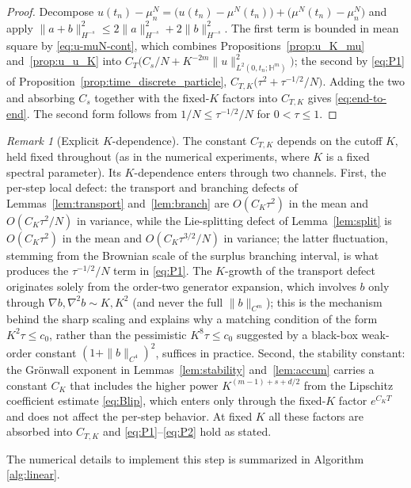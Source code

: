 \documentclass[a4paper,fleqn]{cas-sc}
\theoremstyle{definition}
\theoremstyle{remark}
\newtheorem{remark}[theorem]{Remark}
\begin{document}
\begin{proof}
Decompose $u(t_n)-\mu^N_n=\bigl(u(t_n)-\mu^N(t_n)\bigr)+\bigl(\mu^N(t_n)-\mu^N_n\bigr)$
and apply $\|a+b\|_{H^{-s}}^2\le2\|a\|_{H^{-s}}^2+2\|b\|_{H^{-s}}^2$. The first term is
bounded in mean square by \eqref{eq:u-muN-cont}, which combines
Propositions~\ref{prop:u_K_mu} and~\ref{prop:u_u_K} into
$C_T\bigl(C_s/N+K^{-2m}\|u\|_{L^2(0,t_n;\mathbb H^m)}^2\bigr)$; the second by
\eqref{eq:P1} of Proposition~\ref{prop:time_discrete_particle},
$C_{T,K}\bigl(\tau^2+\tau^{-1/2}/N\bigr)$. Adding the two and absorbing $C_s$ together
with the fixed-$K$ factors into $C_{T,K}$ gives \eqref{eq:end-to-end}. The second form
follows from $1/N\le\tau^{-1/2}/N$ for $0<\tau\le1$.
\end{proof}

\begin{remark}[Explicit $K$-dependence]\label{rem:K-scaling}
The constant $C_{T,K}$ depends on the cutoff $K$, held fixed throughout (as in the
numerical experiments, where $K$ is a fixed spectral parameter). Its
$K$-dependence enters through two channels. First, the per-step local defect: the
transport and branching defects of Lemmas~\ref{lem:transport}
and~\ref{lem:branch} are $O(C_K\tau^2)$ in the mean and $O(C_K\tau^2/N)$ in
variance, while the Lie-splitting defect of Lemma~\ref{lem:split} is
$O(C_K\tau^2)$ in the mean and $O(C_K\tau^{3/2}/N)$ in variance; the latter
fluctuation, stemming from the Brownian scale of the surplus branching interval,
is what produces the $\tau^{-1/2}/N$ term in \eqref{eq:P1}. The $K$-growth of the transport defect originates solely from the
order-two generator expansion, which involves $b$ only through $\nabla b,\nabla^2b
\sim K,K^2$ (and never the full $\|b\|_{C^m}$); this is the mechanism behind the
sharp scaling and explains why a matching condition of the form $K^2\tau\le c_0$,
rather than the pessimistic $K^8\tau\le c_0$ suggested by a black-box weak-order
constant $(1+\|b\|_{C^4})^2$, suffices in practice. Second, the stability constant:
the Gr\"onwall exponent in Lemmas~\ref{lem:stability} and~\ref{lem:accum} carries a
constant $C_K$ that includes the higher power $K^{(m-1)+s+d/2}$ from the Lipschitz
coefficient estimate \eqref{eq:Blip}, which enters only through the fixed-$K$
factor $e^{C_K T}$ and does not affect the per-step behavior. At fixed $K$ all
these factors are absorbed into $C_{T,K}$ and \eqref{eq:P1}--\eqref{eq:P2} hold as
stated.
\end{remark}

The numerical details to implement this step is summarized in Algorithm \ref{alg:linear}.
\end{document}
